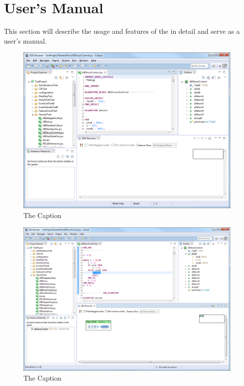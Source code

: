 \chapter{User's Manual} \label{ch:manual}

This section will describe the usage and features of the \SB in detail and serve as a user's manual.

\begin{figure}[hp]
  \centering
    \includegraphics[scale=0.43]{bilder/manual-editor}
  \caption{The Caption}
  \label{fig:manual-editor}
\end{figure}

\begin{figure}[hp]
  \centering
    \includegraphics[scale=0.43]{bilder/manual-executions1}
  \caption{The Caption}
  \label{fig:manual-executions1}
\end{figure}

